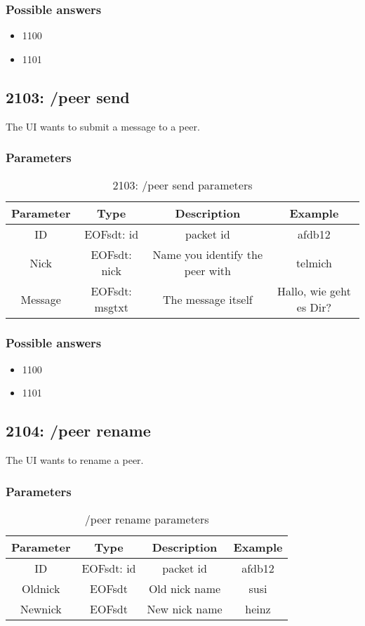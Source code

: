 \documentclass[12pt,a4paper]{book}
\begin{document}
\subsubsection{Possible answers}
\begin{itemize}
\item 1100
\item 1101
\end{itemize}
\subsection{2103: /peer send}
The UI wants to submit a message to a peer.

\subsubsection{Parameters}
%
\begin{longtable}{|c|c|c|c|}
\caption{2103: /peer send parameters}\\
\hline
\textbf{Parameter} & \textbf{Type} & \textbf{Description} & \textbf{Example}\\
\hline
ID & EOFsdt: id & packet id & afdb12\\
\hline
Nick & EOFsdt: nick & Name you identify the peer with & telmich\\
\hline
Message & EOFsdt: msgtxt & The message itself & Hallo, wie geht es Dir?\\
\hline
\end{longtable}

\subsubsection{Possible answers}
\begin{itemize}
\item 1100
\item 1101
\end{itemize}
\subsection{2104: /peer rename}
The UI wants to rename a peer.

\subsubsection{Parameters}
%
\begin{longtable}{|c|c|c|c|}
\caption{/peer rename parameters}\\
\hline
\textbf{Parameter} & \textbf{Type} & \textbf{Description} & \textbf{Example}\\
\hline
ID & EOFsdt: id & packet id & afdb12\\
\hline
Oldnick & EOFsdt & Old nick name & susi\\
\hline
Newnick & EOFsdt & New nick name & heinz\\
\hline
\end{longtable}
\end{document}
